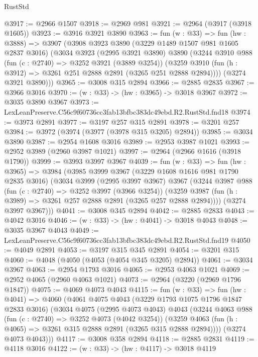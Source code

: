 \begin{lexlean}{RustStd}
\begin{coremodule}
@3917 := @2966 @1507
@3918 := @2969 @981
@3921 := @2964 (@3917 (@3918 @1605))
@3923 := @3916 @3921 @3890
@3963 := fun (w : @33) =>
  fun (hw : @3888) =>
  @3907
    (@3908
      @3923
      @3890
      (@3229 @1489 @1507 @981 @1605 @2837 @3016)
      (@3034
        @3923
        (@2995 @3921 @3890)
        @3890
        (@3244
          @3910
          @988
          (fun (c : @2740) => @3252 @3921 (@3889 @3254))
          (@3259 @3910 (fun (h : @3912) => @3261 @251 @2888 @2891 (@3265 @251 @2888 @2894))))
        (@3274 @3921 @3890)))
@3965 := @3008 @315 @2894
@3966 := @2885 @2835
@3967 := @3966 @3016
@3970 := (w : @33) -> (hw : @3965) -> @3018 @3967
@3972 := @3035 @3890 @3967
@3973 := LexLeanPreserve.C56c9f60736cc3fab13bfbc383dc49ebd.R2.RustStd.fnd18
@3974 := @3973 @2891
@3977 := @3197 @257 @315 @2891
@3978 := @3201 @257
@3984 := @3972 (@3974 (@3977 (@3978 @315 @3205) @2894))
@3985 := @3034 @3890
@3987 := @2954 @1608 @3016
@3989 := @2953 @3987 @1021
@3993 := @2952 @3989 (@2960 @3987 @1021)
@3997 := @2964 (@2966 @1616 (@3918 @1790))
@3999 := @3993 @3997 @3967
@4039 := fun (w : @33) =>
  fun (hw : @3965) =>
  @3984
    (@3985
      @3999
      @3967
      (@3229 @1608 @1616 @981 @1790 @2835 @3016)
      (@3034
        @3999
        (@2995 @3997 @3967)
        @3967
        (@3244
          @3987
          @988
          (fun (c : @2740) => @3252 @3997 (@3966 @3254))
          (@3259 @3987 (fun (h : @3989) => @3261 @257 @2888 @2891 (@3265 @257 @2888 @2894))))
        (@3274 @3997 @3967)))
@4041 := @3008 @345 @2894
@4042 := @2885 @2833
@4043 := @4042 @3016
@4046 := (w : @33) -> (hw : @4041) -> @3018 @4043
@4048 := @3035 @3967 @4043
@4049 := LexLeanPreserve.C56c9f60736cc3fab13bfbc383dc49ebd.R2.RustStd.fnd19
@4050 := @4049 @2891
@4053 := @3197 @315 @345 @2891
@4054 := @3201 @315
@4060 := @4048 (@4050 (@4053 (@4054 @345 @3205) @2894))
@4061 := @3034 @3967
@4063 := @2954 @1793 @3016
@4065 := @2953 @4063 @1021
@4069 := @2952 @4065 (@2960 @4063 @1021)
@4073 := @2964 (@3220 (@2969 @1796 @1847))
@4075 := @4069 @4073 @4043
@4115 := fun (w : @33) =>
  fun (hw : @4041) =>
  @4060
    (@4061
      @4075
      @4043
      (@3229 @1793 @1075 @1796 @1847 @2833 @3016)
      (@3034
        @4075
        (@2995 @4073 @4043)
        @4043
        (@3244
          @4063
          @988
          (fun (c : @2740) => @3252 @4073 (@4042 @3254))
          (@3259 @4063 (fun (h : @4065) => @3261 @315 @2888 @2891 (@3265 @315 @2888 @2894))))
        (@3274 @4073 @4043)))
@4117 := @3008 @358 @2894
@4118 := @2885 @2831
@4119 := @4118 @3016
@4122 := (w : @33) -> (hw : @4117) -> @3018 @4119

\end{coremodule}
\end{lexlean}
